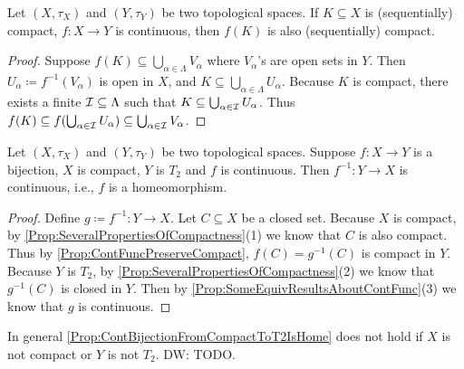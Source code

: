 \documentclass[screen]{techreport}
\numberwithin{equation}{section}
\newcommand{\diw}[1]{{\color{Red} DW: #1}}
\begin{document}
\begin{proposition}\label{Prop:ContFuncPreserveCompact}
	Let $(X,\tau_X)$ and $(Y,\tau_Y)$ be two topological spaces.
	If $K \subseteq X$ is (sequentially) compact, $f : X \to Y$ is continuous, then $f(K)$ is also (sequentially) compact.
\end{proposition}
\begin{proof}
	Suppose $f(K) \subseteq \bigcup_{\alpha \in \Lambda} V_\alpha$ where $V_\alpha$'s are open sets in $Y$.
	Then $U_\alpha \coloneqq f^{-1}(V_\alpha)$ is open in $X$, and $K \subseteq \bigcup_{\alpha \in \Lambda} U_\alpha$.
	Because $K$ is compact, there exists a finite $\mathcal{I} \subseteq \Lambda$ such that $K \subseteq \bigcup_{\alpha \in \mathcal{I}} U_\alpha$.
	Thus $f(K) \subseteq f(\bigcup_{\alpha \in \mathcal{I}} U_\alpha) \subseteq \bigcup_{\alpha \in \mathcal{I}} V_\alpha$.
\end{proof}

\begin{proposition}\label{Prop:ContBijectionFromCompactToT2IsHome}
	Let $(X,\tau_X)$ and $(Y,\tau_Y)$ be two topological spaces.
	Suppose $f : X \to Y$ is a bijection, $X$ is compact, $Y$ is $T_2$ and $f$ is continuous.
	Then $f^{-1} : Y \to X$ is continuous, i.e., $f$ is a homeomorphism.
\end{proposition}
\begin{proof}
	Define $g \coloneqq f^{-1} : Y \to X$.
	Let $C \subseteq X$ be a closed set.
	Because $X$ is compact, by \cref{Prop:SeveralPropertiesOfCompactness}(1) we know that $C$ is also compact.
	Thus by \cref{Prop:ContFuncPreserveCompact}, $f(C) = g^{-1}(C)$ is compact in $Y$.
	Because $Y$ is $T_2$, by \cref{Prop:SeveralPropertiesOfCompactness}(2) we know that $g^{-1}(C)$ is closed in $Y$.
	Then by \cref{Prop:SomeEquivResultsAboutContFunc}(3) we know that $g$ is continuous.
\end{proof}

\begin{example}\label{Exa:ContBijectionNotHome}
	In general \cref{Prop:ContBijectionFromCompactToT2IsHome} does not hold if $X$ is not compact or $Y$ is not $T_2$.
	\diw{TODO.}
\end{example}
\end{document}
